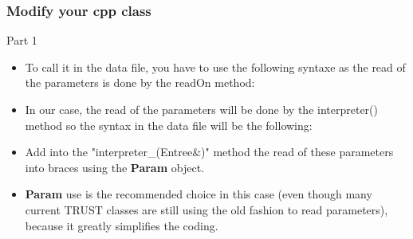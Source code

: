 \documentclass[10pt, hyperref={unicode=true,pdfusetitle, bookmarks=true,bookmarksnumbered=false,bookmarksopen=false, breaklinks=false,pdfborder={0 0 1},backref=true,colorlinks=true,linkcolor=darkblue,pageanchor, urlcolor=darkblue}]{beamer}
\begin{document}
\begin{frame}
\frametitle{Modify your cpp class}
\begin{block}{Part 1}

\begin{itemize}
\item To call it in the data file, you have to use the following syntaxe as the read of the parameters is done by the readOn method:
\begin{center}
\end{center}

\item In our case, the read of the parameters will be done by the interpreter() method so the syntax in the data file will be the following:
\begin{center}
\end{center}

\item Add into the "interpreter\_(Entree\&)" method the read of these parameters into braces using the \textbf{Param} object.

\item \textbf{Param} use is the recommended choice in this case (even though many current TRUST classes are still using the old fashion to read parameters), because it
greatly simplifies the coding.
\end{itemize}

\end{block}
\end{frame}
\end{document}
